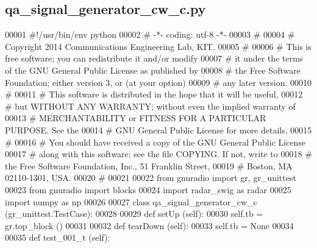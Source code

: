 \subsection{qa\+\_\+signal\+\_\+generator\+\_\+cw\+\_\+c.\+py}
\label{qa__signal__generator__cw__c_8py_source}

\begin{DoxyCode}
00001 \textcolor{comment}{#!/usr/bin/env python}
00002 \textcolor{comment}{# -*- coding: utf-8 -*-}
00003 \textcolor{comment}{# }
00004 \textcolor{comment}{# Copyright 2014 Communications Engineering Lab, KIT.}
00005 \textcolor{comment}{# }
00006 \textcolor{comment}{# This is free software; you can redistribute it and/or modify}
00007 \textcolor{comment}{# it under the terms of the GNU General Public License as published by}
00008 \textcolor{comment}{# the Free Software Foundation; either version 3, or (at your option)}
00009 \textcolor{comment}{# any later version.}
00010 \textcolor{comment}{# }
00011 \textcolor{comment}{# This software is distributed in the hope that it will be useful,}
00012 \textcolor{comment}{# but WITHOUT ANY WARRANTY; without even the implied warranty of}
00013 \textcolor{comment}{# MERCHANTABILITY or FITNESS FOR A PARTICULAR PURPOSE.  See the}
00014 \textcolor{comment}{# GNU General Public License for more details.}
00015 \textcolor{comment}{# }
00016 \textcolor{comment}{# You should have received a copy of the GNU General Public License}
00017 \textcolor{comment}{# along with this software; see the file COPYING.  If not, write to}
00018 \textcolor{comment}{# the Free Software Foundation, Inc., 51 Franklin Street,}
00019 \textcolor{comment}{# Boston, MA 02110-1301, USA.}
00020 \textcolor{comment}{# }
00021 
00022 \textcolor{keyword}{from} gnuradio \textcolor{keyword}{import} gr, gr\_unittest
00023 \textcolor{keyword}{from} gnuradio \textcolor{keyword}{import} blocks
00024 \textcolor{keyword}{import} radar\_swig \textcolor{keyword}{as} radar
00025 \textcolor{keyword}{import} numpy \textcolor{keyword}{as} np
00026 
00027 \textcolor{keyword}{class }qa_signal_generator_cw_c (gr\_unittest.TestCase):
00028 
00029     \textcolor{keyword}{def }setUp (self):
00030         self.tb = gr.top\_block ()
00031 
00032     \textcolor{keyword}{def }tearDown (self):
00033         self.tb = \textcolor{keywordtype}{None}
00034 
00035     \textcolor{keyword}{def }test_001_t (self):

\end{DoxyCode}
